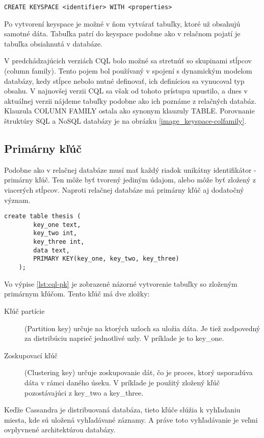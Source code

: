 	\begin{lstlisting}[label=lst:create-keyspace,caption=Syntax pre vytvorenie nového keyspace]
	CREATE KEYSPACE <identifier> WITH <properties>
	\end{lstlisting}
	
	Po vytvorení keyspace je možné v ňom vytvárať tabuľky, ktoré už obsahujú samotné dáta. Tabuľka patrí do keyspace podobne ako v relačnom pojatí je tabuľka obsiahnutá v databáze. 
	
	
	V predchádzajúcich verziách CQL bolo možné sa stretnúť so skupinami stĺpcov (column family). Tento pojem bol používaný v spojení s dynamickým modelom databázy, kedy stĺpce nebolo nutné definovať, ich definíciou sa vynucoval typ obsahu. V najnovšej verzii CQL sa však od tohoto prístupu upustilo, a dnes v aktuálnej verzii nájdeme tabuľky podobne ako ich poznáme z relačných databáz. Klauzula COLUMN FAMILY ostala ako synonym klauzuly TABLE. Porovnanie štruktúry SQL a NoSQL databázy je na obrázku \ref{image_keyspace-colfamily}.
	
	\subsection{Primárny kľúč}
	Podobne ako v relačnej databáze musí mať každý riadok unikátny identifikátor - primárny kľúč. Ten môže byť tvorený jediným údajom, alebo môže byť zložený z viacerých stĺpcov. Naproti relačnej databáze má primárny kľúč aj dodatočný význam.
	
	\begin{lstlisting}[label=lst:cql-pk,caption=Tvorenie primárneho kľúča v CQL]
	create table thesis (
		key_one text,
		key_two int,
		key_three int,
		data text,
		PRIMARY KEY(key_one, key_two, key_three)
	);
	\end{lstlisting}
	
	Vo výpise \ref{lst:cql-pk} je zobrazené názorné vytvorenie tabuľky so zloženým primárnym kľúčom. Tento kľúč má dve zložky:
	\begin{description}
		\item[Kľúč partície] (Partition key) určuje na ktorých uzloch sa uložia dáta. Je tiež zodpovedný za distribúciu naprieč jednotlivé uzly. V príklade je to key\_one.
		\item[Zoskupovací kľúč] (Clustering key) určuje zoskupovanie dát, čo je proces, ktorý usporadúva dáta v rámci daného úseku. V príklade je použitý zložený kľúč pozostávajúci z key\_two a key\_three.
	\end{description}
	Keďže Cassandra je distribuovaná databáza, tieto kľúče slúžia k vyhľadaniu miesta, kde sú uložená vyhľadávané záznamy. A práve toto vyhľadávanie je veľmi ovplyvnené architektúrou databázy.
	
